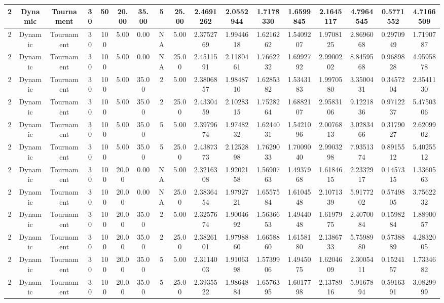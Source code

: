 \begin{longtable}{ | c | c | c | c | c | c | c | c | c | c | c | c | c | c | c | c | c | }
	\hline
	2	&	Dynamic	&	Tournament	&	30	&	50	&	20.00	&	35.00	&	5	&	25.00	&	2.4691262	&	2.0552944	&	1.7178330	&	1.6599845	&	2.1645117	&	4.7964545	&	0.5771552	&	4.7166509 \\
	\hline
	2	&	Dynamic	&	Tournament	&	30	&	100	&	5.00	&	0.00	&	NA	&	5.00	&	2.3752769	&	1.9944618	&	1.6216262	&	1.5409207	&	1.9708125	&	2.8696068	&	0.2970949	&	1.7190787 \\
	\hline
	2	&	Dynamic	&	Tournament	&	30	&	100	&	5.00	&	0.00	&	NA	&	25.00	&	2.4511591	&	2.1180461	&	1.7662232	&	1.6992792	&	2.9900202	&	8.8459568	&	0.9689828	&	4.9595878 \\
	\hline
	2	&	Dynamic	&	Tournament	&	30	&	100	&	5.00	&	35.00	&	2	&	5.00	&	2.3806857	&	1.9848710	&	1.6285382	&	1.5343183	&	1.9970580	&	3.3500431	&	0.3457204	&	2.3541130 \\
	\hline
	2	&	Dynamic	&	Tournament	&	30	&	100	&	5.00	&	35.00	&	2	&	25.00	&	2.4330459	&	2.1028315	&	1.7528264	&	1.6882107	&	2.9583106	&	9.1221836	&	0.9712237	&	5.4750306 \\
	\hline
	2	&	Dynamic	&	Tournament	&	30	&	100	&	5.00	&	35.00	&	5	&	5.00	&	2.3979674	&	1.9748232	&	1.6244031	&	1.5421096	&	2.0076813	&	3.0283466	&	0.3179027	&	2.6209902 \\
	\hline
	2	&	Dynamic	&	Tournament	&	30	&	100	&	5.00	&	35.00	&	5	&	25.00	&	2.4387373	&	2.1252898	&	1.7629033	&	1.7009040	&	2.9903298	&	7.9351374	&	0.8915512	&	5.4025512 \\
	\hline
	2	&	Dynamic	&	Tournament	&	30	&	100	&	20.00	&	0.00	&	NA	&	5.00	&	2.3216308	&	1.9202158	&	1.5690763	&	1.4937968	&	1.6184615	&	2.2332917	&	0.1457315	&	1.3360563 \\
	\hline
	2	&	Dynamic	&	Tournament	&	30	&	100	&	20.00	&	0.00	&	NA	&	25.00	&	2.3836454	&	1.9792721	&	1.6557584	&	1.6104548	&	2.1071339	&	5.9177202	&	0.5749805	&	3.7562232 \\
	\hline
	2	&	Dynamic	&	Tournament	&	30	&	100	&	20.00	&	35.00	&	2	&	5.00	&	2.3257674	&	1.9004692	&	1.5636653	&	1.4944048	&	1.6197975	&	2.4070084	&	0.1598284	&	1.8890057 \\
	\hline
	2	&	Dynamic	&	Tournament	&	30	&	100	&	20.00	&	35.00	&	2	&	25.00	&	2.3826101	&	1.9798860	&	1.6658860	&	1.6158180	&	2.1386733	&	5.7598980	&	0.5738889	&	4.2832005 \\
	\hline
	2	&	Dynamic	&	Tournament	&	30	&	100	&	20.00	&	35.00	&	5	&	5.00	&	2.3114003	&	1.9106398	&	1.5739906	&	1.4945075	&	1.6204609	&	2.3005411	&	0.1524157	&	1.7334682 \\
	\hline
	2	&	Dynamic	&	Tournament	&	30	&	100	&	20.00	&	35.00	&	5	&	25.00	&	2.3935522	&	1.9864884	&	1.6576395	&	1.6017798	&	2.1378916	&	5.9167894	&	0.5916391	&	3.0829999 \\

\end{longtable}

